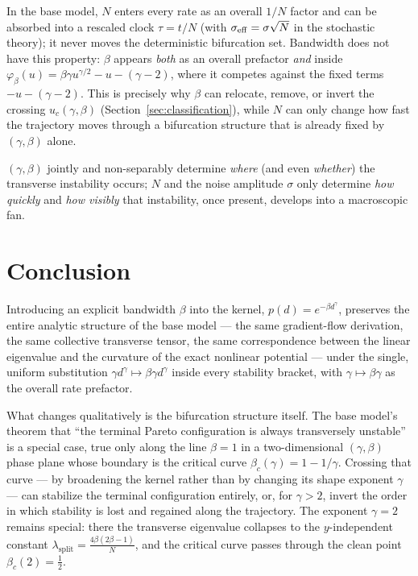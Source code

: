 \documentclass[11pt,a4paper]{article}
\theoremstyle{plain}
\theoremstyle{definition}
\theoremstyle{remark}
\newcommand{\lsplit}{\lambda_{\mathrm{split}}}
\newcommand{\bw}{\beta}
\newcommand{\phib}{\varphi_{\bw}}
\newcommand{\bwc}{\beta_c}
\begin{document}
In the base model, $N$ enters every rate as an overall $1/N$ factor and can
be absorbed into a rescaled clock $\tau=t/N$ (with $\sigma_{\rm eff}=\sigma\sqrt N$
in the stochastic theory); it never moves the deterministic bifurcation set.
Bandwidth does not have this property: $\bw$ appears \emph{both} as an
overall prefactor \emph{and} inside $\phib(u)=\bw\gamma u^{\gamma/2}-u-(\gamma-2)$,
where it competes against the fixed terms $-u-(\gamma-2)$. This is precisely
why $\bw$ can relocate, remove, or invert the crossing $u_c(\gamma,\bw)$
(Section~\ref{sec:classification}), while $N$ can only change how fast the
trajectory moves through a bifurcation structure that is already fixed by
$(\gamma,\bw)$ alone.

\begin{keybox}[Summary]
$(\gamma,\bw)$ jointly and non-separably determine \emph{where} (and even
\emph{whether}) the transverse instability occurs; $N$ and the noise
amplitude $\sigma$ only determine \emph{how quickly} and \emph{how visibly}
that instability, once present, develops into a macroscopic fan.
\end{keybox}

\section{Conclusion}
\label{sec:conclusion}

Introducing an explicit bandwidth $\bw$ into the kernel, $p(d)=e^{-\bw d^\gamma}$,
preserves the entire analytic structure of the base model — the same
gradient-flow derivation, the same collective transverse tensor, the same
correspondence between the linear eigenvalue and the curvature of the exact
nonlinear potential — under the single, uniform substitution
$\gamma d^{\gamma}\mapsto\bw\gamma d^{\gamma}$ inside every stability
bracket, with $\gamma\mapsto\bw\gamma$ as the overall rate prefactor.

What changes qualitatively is the bifurcation structure itself. The
base model's theorem that ``the terminal Pareto configuration is always
transversely unstable'' is a special case, true only along the line
$\bw=1$ in a two-dimensional $(\gamma,\bw)$ phase plane whose boundary is
the critical curve $\bwc(\gamma)=1-1/\gamma$. Crossing that curve — by
broadening the kernel rather than by changing its shape exponent $\gamma$ —
can stabilize the terminal configuration entirely, or, for $\gamma>2$,
invert the order in which stability is lost and regained along the
trajectory. The exponent $\gamma=2$ remains special: there the transverse
eigenvalue collapses to the $y$-independent constant
$\lsplit=\tfrac{4\bw(2\bw-1)}{N}$, and the critical curve passes through
the clean point $\bwc(2)=\tfrac12$.
\end{document}
